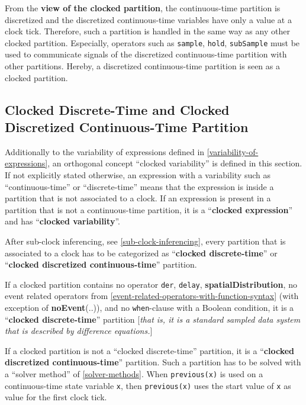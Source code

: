 From the \textbf{view of the clocked partition}, the continuous-time
partition is discretized and the discretized continuous-time variables
have only a value at a clock tick. Therefore, such a partition is
handled in the same way as any other clocked partition. Especially,
operators such as \lstinline[basicstyle=\ttfamily]!sample!, \lstinline[basicstyle=\ttfamily]!hold!, \lstinline[basicstyle=\ttfamily]!subSample! must be used to communicate
signals of the discretized continuous-time partition with other
partitions. Hereby, a discretized continuous-time partition is seen as a
clocked partition.

\subsection{Clocked Discrete-Time and Clocked Discretized Continuous-Time Partition}

Additionally to the variability of expressions defined in \autoref{variability-of-expressions},
an orthogonal concept ``clocked variability'' is defined in this
section. If not explicitly stated otherwise, an expression with a
variability such as ``continuous-time'' or ``discrete-time'' means that
the expression is inside a partition that is not associated to a clock.
If an expression is present in a partition that is not a continuous-time
partition, it is a ``\textbf{clocked expression}'' and has
``\textbf{clocked variability}''.

After sub-clock inferencing, see \autoref{sub-clock-inferencing}, every partition that is
associated to a clock has to be categorized as ``\textbf{clocked
discrete-time}'' or ``\textbf{clocked discretized continuous-time}''
partition.

If a clocked partition contains no operator \lstinline[basicstyle=\ttfamily]!der!,
\lstinline[basicstyle=\ttfamily]!delay!, \textbf{spatialDistribution}, no event related operators
from \autoref{event-related-operators-with-function-syntax} (with exception of \textbf{noEvent}(..)), and no
\lstinline[basicstyle=\ttfamily]!when!-clause with a Boolean condition, it is a ``\textbf{clocked
discrete-time}'' partition {[}\emph{that is, it is a standard sampled
data system that is described by difference equations.}{]}

If a clocked partition is not a ``clocked discrete-time'' partition, it
is a ``\textbf{clocked discretized continuous-time}'' partition. Such a
partition has to be solved with a ``solver method'' of \autoref{solver-methods}.
When \lstinline[basicstyle=\ttfamily]!previous(x)! is used on a continuous-time state variable \lstinline[basicstyle=\ttfamily]!x!, then
\lstinline[basicstyle=\ttfamily]!previous(x)! uses the start value of \lstinline[basicstyle=\ttfamily]!x! as value for the first clock tick.


